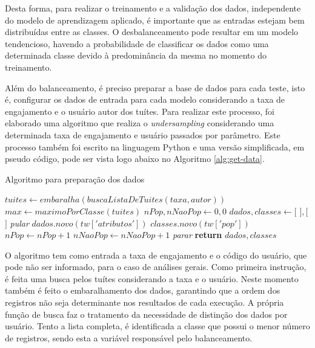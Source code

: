 \documentclass[oneside,openright,12pt]{ufsm_2015} %
\begin{document}
    \par Desta forma, para realizar o treinamento e a validação dos dados, independente do modelo de aprendizagem aplicado, é importante que as entradas estejam bem distribuídas entre as classes. O desbalanceamento pode resultar em um modelo tendencioso, havendo a probabilidade de classificar os dados como uma determinada classe devido à predominância da mesma no momento do treinamento.

    \par Além do balanceamento, é preciso preparar a base de dados para cada teste, isto é, configurar os dados de entrada para cada modelo considerando a taxa de engajamento e o usuário autor dos tuítes. Para realizar este processo, foi elaborado uma algoritmo que realiza o \textit{undersampling} considerando uma determinada taxa de engajamento e usuário passados por parâmetro. Este processo também foi escrito na linguagem Python e uma versão simplificada, em pseudo código, pode ser vista logo abaixo no Algoritmo \ref{alg:get-data}.
    
    \begin{algorithm}[ht]
    \caption{Algoritmo para preparação dos dados}
    \label{alg:get-data}
    \begin{algorithmic}[1]
        \State $tuites \gets embaralha(buscaListaDeTuites(taxa, autor))$
        \State 
        \State $max \gets maximoPorClasse(tuites)$
        \State $nPop, nNaoPop \gets 0, 0$
        \State $dados, classes \gets [$ $], [$ $]$
        \State
                \State \textit{pular}
            \EndIf
            \State $dados.novo(tw['atributos'])$
            \State $classes.novo(tw['pop'])$
                \State $nPop \gets nPop + 1$
            \Else
                \State $nNaoPop \gets nNaoPop + 1$
            \EndIf
                \State \textit{parar}
            \EndIf
        \EndFor
        \State \textbf{return} $dados, classes$
        \EndFunction
    \end{algorithmic}
    \end{algorithm}
    
    \par O algoritmo tem como entrada a taxa de engajamento e o código do usuário, que pode não ser informado, para o caso de análises gerais. Como primeira instrução, é feita uma busca pelos tuítes considerando a taxa e o usuário. Neste momento também é feito o embaralhamento dos dados, garantindo que a ordem dos registros não seja determinante nos resultados de cada execução. A própria função de busca faz o tratamento da necessidade de distinção dos dados por usuário. Tento a lista completa, é identificada a classe que possui o menor número de registros, sendo esta a variável responsável pelo balanceamento. 
    
\end{document}
